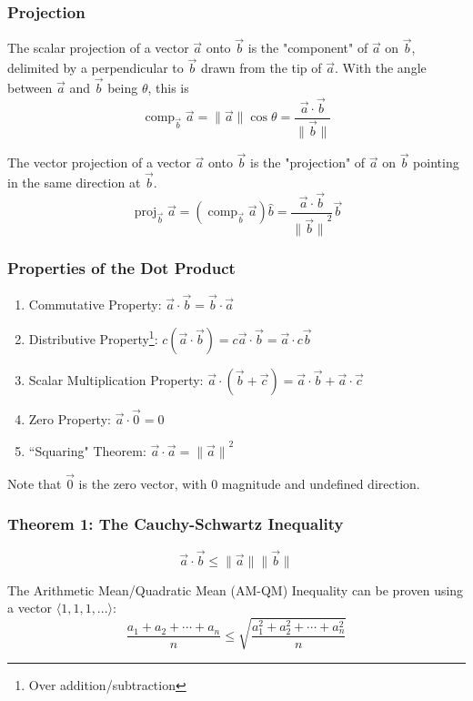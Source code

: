 \documentclass{article}
\DeclareMathOperator{\comp}{comp}
\DeclareMathOperator{\proj}{proj}
\newcommand{\vect}[1]{\ensuremath{\overrightarrow{#1}}}
\newcommand{\magnitude}[1]{\ensuremath{\lVert #1 \rVert}}
\newcommand{\magvect}[1]{\magnitude{\vect{#1}}}
\begin{document}
\subsubsection{Projection}
The scalar projection of a vector \vect{a} onto \vect{b} is the "component" of \vect{a} on \vect{b}, delimited by a perpendicular to \vect{b} drawn from the tip of \vect{a}. With the angle between \vect{a} and \vect{b} being $\theta$, this is
$$\comp_{\vect{b}} \vect{a} = \magvect{a}\cos{\theta} = \frac{\vect{a} \cdot \vect{b}}{\magvect{b}}$$

The vector projection of a vector \vect{a} onto \vect{b} is the "projection" of \vect{a} on \vect{b} pointing in the same direction at \vect{b}.
$$\proj_{\vect{b}}\vect{a} = \left(\comp_{\vect{b}}\vect{a}\right)\hat{b} = \frac{\vect{a} \cdot \vect{b}}{\magvect{b}^2} \vect{b}$$

\subsubsection{Properties of the Dot Product}
\begin{enumerate}
    \item Commutative Property: $\vect{a} \cdot \vect{b} = \vect{b} \cdot \vect{a}$
    \item Distributive Property\footnote{Over addition/subtraction}: $c\left(\vect{a} \cdot \vect{b}\right) = c\vect{a} \cdot \vect{b} = \vect{a} \cdot c\vect{b}$
    \item Scalar Multiplication Property: $\vect{a} \cdot \left(\vect{b} + \vect{c}\right) = \vect{a} \cdot \vect{b} + \vect{a} \cdot \vect{c}$
    \item Zero Property: $\vect{a} \cdot \vect{0} = 0$
    \item ``Squaring" Theorem: $\vect{a} \cdot \vect{a} = \magvect{a}^2$
\end{enumerate}
Note that $\vect{0}$ is the zero vector, with $0$ magnitude and undefined direction.

\subsubsection{Theorem 1: The Cauchy-Schwartz Inequality}
$$\vect{a} \cdot \vect{b} \le \magvect{a}\magvect{b}$$

The Arithmetic Mean/Quadratic Mean (AM-QM) Inequality can be proven using a vector $\langle1, 1, 1, ...\rangle$:
$$\frac{a_1 + a_2 + \cdots + a_n}{n} \le \sqrt{\frac{a_1^2 + a_2^2 + \cdots + a_n^2}{n}}$$
\end{document}
